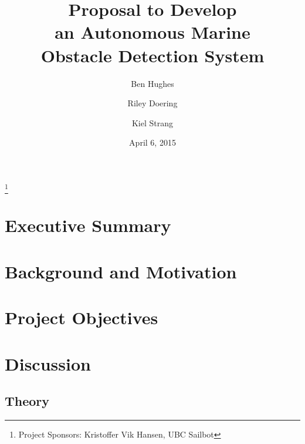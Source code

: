 \documentclass[amsmath, amssymb, aps, pra, 12pt]{revtex4-1}
\begin{document}
\title{Proposal to Develop\\an Autonomous Marine\\Obstacle Detection System}
\author{Ben Hughes}
\thanks{Project Sponsors: Kristoffer Vik Hansen, UBC Sailbot}
\author{Riley Doering}
\author{Kiel Strang}
\date{April 6, 2015}
\maketitle


\section*{Executive Summary}


\newpage
\tableofcontents

\makeatletter
\let\toc@pre\relax
\let\toc@post\relax
\makeatother 

\newpage
\listoffigures
\listoftables

\clearpage
\newpage
{}


\section{\label{sec:intro}Background and Motivation}


\section{\label{sec:objectives}Project Objectives}



\section{\label{sec:discussion}Discussion}


\subsection{\label{sec:discussion:theory}Theory}

\end{document}
